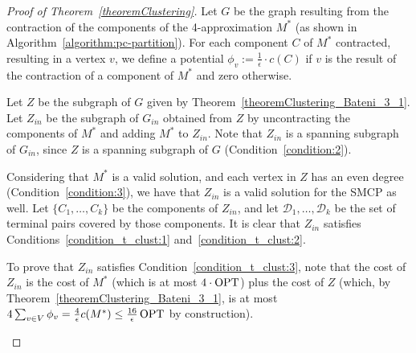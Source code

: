 \begin{proof}[Proof of Theorem~\ref{theoremClustering}]

Let \(G\) be the graph resulting from the contraction of the components of the 4-approximation \(M^\ast\) (as shown in Algorithm~\ref{algorithm:pc-partition}). For each component \(C\) of \(M^\ast\) contracted, resulting in a vertex \(v\), we define a potential \(\phi_v := \frac{1}{\epsilon} \cdot c(C)\) if \(v\) is the result of the contraction of a component of \(M^\ast\) and zero otherwise. 

Let \(Z\) be the subgraph of \(G\) given by Theorem~\ref{theoremClustering_Bateni_3_1}. Let \(Z_{in}\) be the subgraph of \(G_{in}\) obtained from \(Z\) by uncontracting the components of \(M^\ast\) and adding \(M^\ast\) to \(Z_{in}\). Note that \(Z_{in}\) is a spanning subgraph of \(G_{in}\), since \(Z\) is a spanning subgraph of \(G\) (Condition~\eqref{condition:2}).

Considering that \(M^\ast\) is a valid solution, and each vertex in \(Z\) has an even degree (Condition~\eqref{condition:3}), we have that \(Z_{in}\) is a valid solution for the SMCP as well. Let \(\{C_1, \dots, C_k\}\) be the components of \(Z_{in}\), and let \(\mathcal{D}_1, \dots, \mathcal{D}_k\) be the set of terminal pairs covered by those components. It is clear that \(Z_{in}\) satisfies Conditions~\eqref{condition_t_clust:1} and~\eqref{condition_t_clust:2}.

To prove that \(Z_{in}\) satisfies Condition~\eqref{condition_t_clust:3}, note that the cost of \(Z_{in}\) is the cost of \(M^\ast\) (which is at most \(4 \cdot \operatorname{\textrm{OPT}}\)) plus the cost of \(Z\) (which, by Theorem~\ref{theoremClustering_Bateni_3_1}, is at most \( 4 \sum_{v \in V} \phi_v = \frac{4}{\epsilon} c(M^\ast) \leq \frac{16}{\epsilon} \operatorname{\textrm{OPT}} \) by construction).


\begin{figure}[H]
    \centering
\end{figure}
\end{proof}
